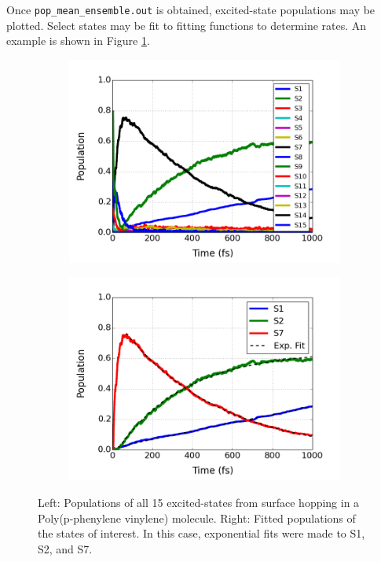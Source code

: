 \documentclass[letterpaper,12pt,titlepage]{article}
\begin{document}
Once \verb+pop_mean_ensemble.out+ is obtained, excited-state populations may be plotted.  Select states may be fit to fitting functions to determine rates.  An example is shown in Figure \ref{pop_fit}.
\begin{figure}[h]
        \centering
        \begin{subfigure}[h]{0.475\textwidth}
            \centering
            \includegraphics[scale=.4]{pop_hops_allstates.png}
        \end{subfigure}
	\hspace{3mm}
        \begin{subfigure}[h]{0.475\textwidth}  
            \centering 
            \includegraphics[scale=.4]{pop_hops_expfit.png}
        \end{subfigure}
        \caption{\small Left: Populations of all 15 excited-states from surface hopping in a Poly(p-phenylene vinylene) molecule.  Right: Fitted populations of the states of interest.  In this case, exponential fits were made to S1, S2, and S7.} 
\label{pop_fit}
\end{figure}
\end{document}
